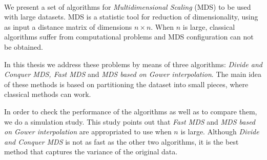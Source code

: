 \documentclass[11pt]{report}
\begin{document}










\thispagestyle{empty}





\clearpage\mbox{}\clearpage

 \\
\indent We present a set of algorithms for \textit{Multidimensional Scaling} 
(MDS) to be used with large datasets. MDS is a statistic tool for reduction of 
dimensionality, using as input a distance matrix of dimensions 
$n \times n$. When $n$ is large, classical algorithms suffer from computational 
problems and MDS configuration can not be obtained.

\indent In this thesis we address these problems by means of three algorithms:
\textit{Divide and Conquer MDS, Fast MDS} and 
\textit{MDS based on Gower interpolation}. The main idea of these methods is
based on partitioning the dataset into small pieces, where classical 
methods can work.

\indent In order to check the performance of the algorithms as well as to 
compare them, we do a simulation study. This study
points out that \textit{Fast MDS} and \textit{MDS based on Gower interpolation} 
are appropriated to use when $n$ is large. Although 
\textit{Divide and Conquer MDS} is not as fast as the other two algorithms,
it is the best method that captures the variance of the original data. 


\clearpage\mbox{}\clearpage

\tableofcontents
\thispagestyle{empty}
\end{document}
